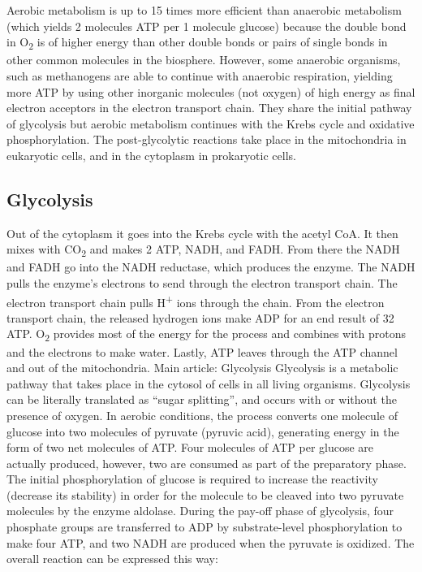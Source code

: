 Aerobic metabolism is up to 15 times more efficient than anaerobic metabolism (which yields 2 molecules ATP per 1 molecule glucose) because the double bond in O\textsubscript{2} is of higher energy than other double bonds or pairs of single bonds in other common molecules in the biosphere. However, some anaerobic organisms, such as methanogens are able to continue with anaerobic respiration, yielding more ATP by using other inorganic molecules (not oxygen) of high energy as final electron acceptors in the electron transport chain. They share the initial pathway of glycolysis but aerobic metabolism continues with the Krebs cycle and oxidative phosphorylation. The post-glycolytic reactions take place in the mitochondria in eukaryotic cells, and in the cytoplasm in prokaryotic cells.

\hypertarget{glycolysis}{%
\subsection{Glycolysis}\label{glycolysis}}

Out of the cytoplasm it goes into the Krebs cycle with the acetyl CoA. It then mixes with CO\textsubscript{2} and makes 2 ATP, NADH, and FADH. From there the NADH and FADH go into the NADH reductase, which produces the enzyme. The NADH pulls the enzyme's electrons to send through the electron transport chain. The electron transport chain pulls H\textsuperscript{+} ions through the chain. From the electron transport chain, the released hydrogen ions make ADP for an end result of 32 ATP. O\textsubscript{2} provides most of the energy for the process and combines with protons and the electrons to make water. Lastly, ATP leaves through the ATP channel and out of the mitochondria.
Main article: Glycolysis
Glycolysis is a metabolic pathway that takes place in the cytosol of cells in all living organisms. Glycolysis can be literally translated as ``sugar splitting'', and occurs with or without the presence of oxygen. In aerobic conditions, the process converts one molecule of glucose into two molecules of pyruvate (pyruvic acid), generating energy in the form of two net molecules of ATP. Four molecules of ATP per glucose are actually produced, however, two are consumed as part of the preparatory phase. The initial phosphorylation of glucose is required to increase the reactivity (decrease its stability) in order for the molecule to be cleaved into two pyruvate molecules by the enzyme aldolase. During the pay-off phase of glycolysis, four phosphate groups are transferred to ADP by substrate-level phosphorylation to make four ATP, and two NADH are produced when the pyruvate is oxidized. The overall reaction can be expressed this way:

